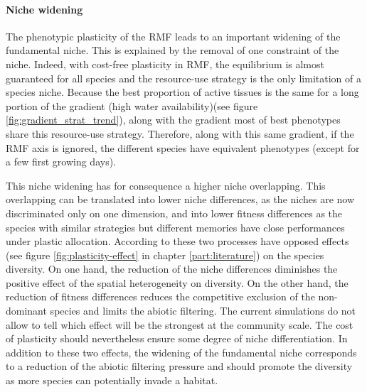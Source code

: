 


\paragraph{Niche widening}

The phenotypic plasticity of the RMF leads to an important widening of the fundamental niche. This is explained by the removal of one constraint of the niche. Indeed, with cost-free plasticity in RMF, the equilibrium is almost guaranteed for all species and the resource-use strategy is the only limitation of a species niche. Because the best proportion of active tissues is the same for a long portion of the gradient (high water availability)(see figure \ref{fig:gradient_strat_trend}), along with the gradient most of best phenotypes share this resource-use strategy. Therefore, along with this same gradient, if the RMF axis is ignored, the different species have equivalent phenotypes (except for a few first growing days).

This niche widening has for consequence a higher niche overlapping. This overlapping can be translated into lower niche differences, as the niches are now discriminated only on one dimension, and into lower fitness differences as the species with similar strategies but different memories have close performances under plastic allocation. According to \cite{turcotte_phenotypic_2016} these two processes have opposed effects (see figure \ref{fig:plasticity-effect} in chapter \ref{part:literature}) on the species diversity. On one hand, the reduction of the niche differences diminishes the positive effect of the spatial heterogeneity on diversity. On the other hand, the reduction of fitness differences reduces the competitive exclusion of the non-dominant species and limits the abiotic filtering. The current simulations do not allow to tell which effect will be the strongest at the community scale. The cost of plasticity should nevertheless ensure some degree of niche differentiation. In addition to these two effects, the widening of the fundamental niche corresponds to a reduction of the abiotic filtering pressure and should promote the diversity as more species can potentially invade a habitat. 

